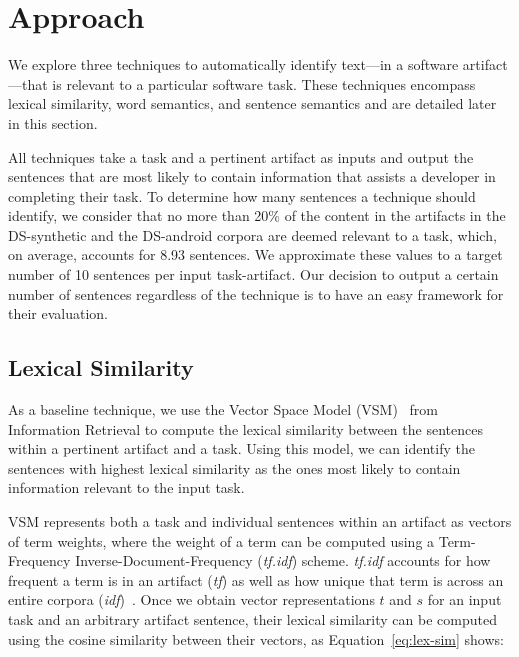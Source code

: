 \section{Approach}
\label{cp5:approaches}


We explore three techniques to automatically identify text---in a software artifact---that is relevant to a particular software task.
These techniques encompass lexical similarity, word semantics, and sentence semantics and are detailed later in this section.



All techniques take a task and a pertinent artifact as inputs and output the sentences 
that are most likely to contain information that assists a developer in completing their task. 
To determine how many sentences a technique should identify, we consider that 
no more than 20\% of the content in the artifacts in the
 \acs{DS-synthetic} and the \acs{DS-android} corpora are deemed relevant to a task, which, on average, accounts for 8.93 sentences. 
We approximate these values to a target number of 10 sentences per input task-artifact. 
Our decision to output a certain number of sentences regardless of the technique is to have an easy framework for their evaluation.



\subsection{Lexical Similarity}

As a baseline technique, we use the Vector Space Model (VSM)~\cite{Salton1975vsm} from Information Retrieval
to compute the lexical similarity between the sentences within a pertinent artifact and a task. 
Using this model, we can identify the sentences with highest lexical similarity 
as the ones most likely to contain information relevant to the input task.




VSM represents both a task and individual sentences within an artifact as vectors of term weights,
where the weight of a term
can be computed using a Term-Frequency Inverse-Document-Frequency (\textit{tf.idf}) scheme.
\textit{tf.idf} accounts for how frequent a term is in an artifact (\textit{tf}) as well as how 
unique that term is across an entire corpora (\textit{idf})~\cite{Manning2009IR}.
Once we obtain vector representations $t$ and $s$ 
for an input task and an arbitrary artifact sentence, 
their lexical similarity can be computed 
using the cosine similarity between their vectors, as Equation~\ref{eq:lex-sim} shows:



